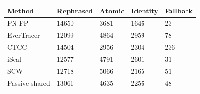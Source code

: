 \begin{tabular}{lllll}
\toprule
Method & Rephrased & Atomic & Identity & Fallback \\
\midrule
PN-FP & 14650 & 3681 & 1646 & 23 \\
EverTracer & 12099 & 4864 & 2959 & 78 \\
CTCC & 14504 & 2956 & 2304 & 236 \\
iSeal & 12577 & 4791 & 2601 & 31 \\
SCW & 12718 & 5066 & 2165 & 51 \\
Passive shared & 13061 & 4635 & 2256 & 48 \\
\bottomrule
\end{tabular}
